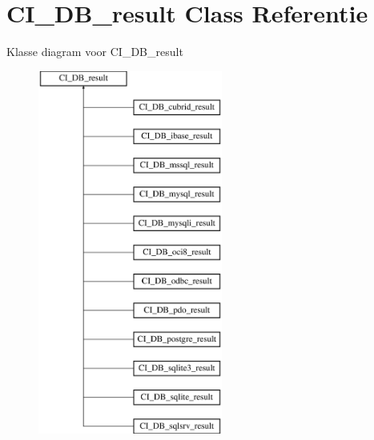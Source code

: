 \hypertarget{class_c_i___d_b__result}{}\section{C\+I\+\_\+\+D\+B\+\_\+result Class Referentie}
\label{class_c_i___d_b__result}
Klasse diagram voor C\+I\+\_\+\+D\+B\+\_\+result\begin{figure}[H]
\begin{center}
\leavevmode
\includegraphics[height=12.000000cm]{class_c_i___d_b__result}
\end{center}
\end{figure}
